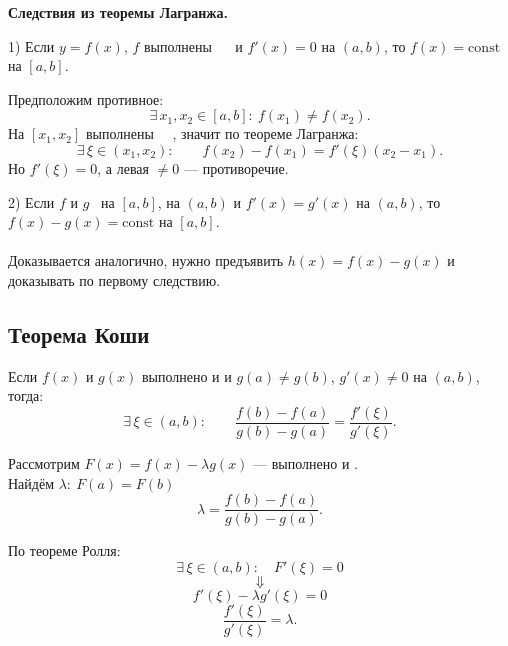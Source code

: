 \textbf{Следствия из теоремы Лагранжа.}

1) Если $y=f(x)$, $f$ выполнены \ \  и
$f'(x)=0$ на $(a,b)$, то $f(x)=\mathrm{const}$ на $[a,b]$.

\begin{Proof}
Предположим противное:
\[
\exists\,x_1,x_2\in[a,b]:\ f(x_1)\ne f(x_2).
\]
На $[x_1,x_2]$ выполнены \ \ , значит по теореме Лагранжа:
\[
\exists\,\xi\in(x_1,x_2):\qquad f(x_2)-f(x_1)=f'(\xi)(x_2-x_1).
\]
Но $f'(\xi)=0$, а левая $\ne 0$ — противоречие.
\end{Proof}

2) Если $f$ и $g$ \ на  $[a,b]$,  на $(a,b)$ и
$f'(x)=g'(x)$ на $(a,b)$, то $f(x)-g(x)=\mathrm{const}$ на $[a,b]$.
\\
\\
Доказывается аналогично, нужно предъявить $h(x) = f(x) - g(x)$ и доказывать по первому следствию.

\subsection{Теорема Коши}
\begin{theorem}
Если $f(x)$ и $g(x)$ выполнено  и  и $g(a)\ne g(b)$,
$g'(x)\ne 0$ на $(a,b)$, тогда:
\[
\exists\,\xi\in(a,b):\qquad
\frac{f(b)-f(a)}{g(b)-g(a)}=\frac{f'(\xi)}{g'(\xi)}.
\]
\end{theorem}

\begin{Proof}
Рассмотрим $F(x)=f(x)-\lambda g(x)$ — выполнено  и .\\
Найдём $\lambda:\ F(a)=F(b)$
\[
\lambda=\frac{f(b)-f(a)}{g(b)-g(a)}.
\]

По теореме Ролля:
\[
\exists\,\xi\in(a,b):\quad F'(\xi)=0
\]
\[
\Downarrow
\]
\[
f'(\xi)-\lambda g'(\xi)=0
\]
\[
\frac{f'(\xi)}{g'(\xi)}=\lambda.
\]
\end{Proof}